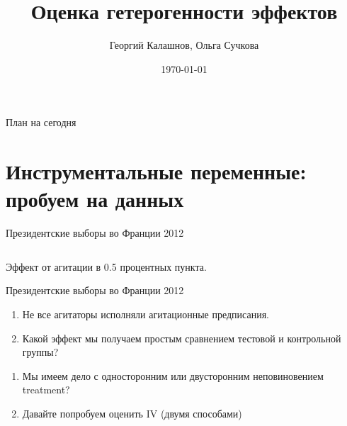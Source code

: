 \documentclass[12pt]{beamer}
\title{Оценка гетерогенности эффектов}
\author[Георгий Калашнов, Ольга Сучкова]{Георгий Калашнов, Ольга Сучкова}
\date{\today}
\begin{document}
\begin{frame}
  \titlepage
  
\end{frame}


\begin{frame}{План на сегодня} 
\tableofcontents
\end{frame}

\section{Инструментальные переменные: пробуем на данных}

\begin{frame}{Президентские выборы во Франции 2012 \parencite{pons2018will}}
\begin{columns}
\end{columns}
Эффект от агитации в 0.5 процентных пункта. 
\end{frame}


\begin{frame}{Президентские выборы во Франции 2012 \parencite{pons2018will}}

\begin{enumerate}
    \item Не все агитаторы исполняли агитационные предписания.
    \item Какой эффект мы получаем простым сравнением тестовой и контрольной группы?
\end{enumerate}

\begin{enumerate}
    \item Мы имеем дело с односторонним или двусторонним неповиновением treatment?
    \item Давайте попробуем оценить IV (двумя способами)
\end{enumerate}

\end{frame}
\end{document}
